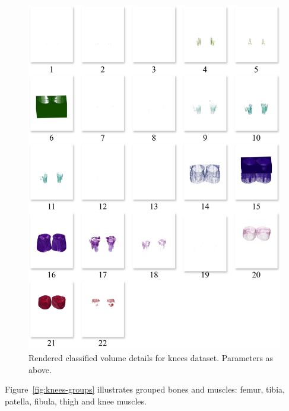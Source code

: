 \begin{figure}[htb!]
    \centering
    \includegraphics[width=\columnwidth]{figs/knees-clusters.jpg} 
    \caption{Rendered classified volume details for knees dataset. Parameters as above.}
    \label{fig:knees-clusters}
\end{figure}

Figure~\ref{fig:knees-groups} illustrates grouped bones and muscles: femur, tibia, patella, fibula, thigh and knee muscles.

